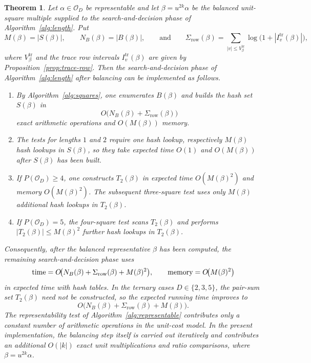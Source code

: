 \documentclass[manuscript,screen]{acmart}
\renewcommand{\le}{\leqslant}
\renewcommand{\ge}{\geqslant}
\theoremstyle{plain}
\newtheorem{theorem}{Theorem}[section]
\theoremstyle{definition}
\theoremstyle{nonitalicremark}
\newcommand{\OD}{\mathcal{O}_D}
\begin{document}
\begin{theorem}\label{thm:complexityM}
Let $\alpha\in\OD$ be representable and let $\beta=u^{2k}\alpha$ be the balanced unit-square
multiple supplied to the search-and-decision phase of Algorithm~\ref{alg:length}. Put
\[
M(\beta)=|S(\beta)|,
\qquad
N_B(\beta)=|B(\beta)|,
\qquad\text{and}\qquad
\Sigma_{\mathrm{row}}(\beta)=\sum_{|v|\le V_\beta^{\mathrm{tr}}}\log\bigl(1+|I_v^{\mathrm{tr}}(\beta)|\bigr),
\]
where $V_\beta^{\mathrm{tr}}$ and the trace row intervals $I_v^{\mathrm{tr}}(\beta)$ are given by
Proposition~\ref{prop:trace-row}. Then the search-and-decision phase of Algorithm~\ref{alg:length} after balancing can be implemented as follows.
\begin{enumerate}[label=\textup{(\alph*)},itemsep=0.25em]
\item By Algorithm~\ref{alg:squares}, one enumerates $B(\beta)$ and builds the hash set
$S(\beta)$ in
\[
O\!\bigl(N_B(\beta)+\Sigma_{\mathrm{row}}(\beta)\bigr)
\]
exact arithmetic operations and $O(M(\beta))$ memory.
\item The tests for lengths $1$ and $2$ require one hash lookup, respectively
$M(\beta)$ hash lookups in $S(\beta)$, so they take expected time $O(1)$ and
$O(M(\beta))$ after $S(\beta)$ has been built.
\item If $P(\OD)\ge 4$, one constructs $T_2(\beta)$ in expected time $O(M(\beta)^2)$ and
memory $O(M(\beta)^2)$. The subsequent three-square test uses only $M(\beta)$ additional hash
lookups in $T_2(\beta)$.
\item If $P(\OD)=5$, the four-square test scans $T_2(\beta)$ and performs
$|T_2(\beta)|\le M(\beta)^2$ further hash lookups in $T_2(\beta)$.
\end{enumerate}
Consequently, after the balanced representative $\beta$ has been computed, the remaining
search-and-decision phase uses
\[
\textup{time}=O\!\bigl(N_B(\beta)+\Sigma_{\mathrm{row}}(\beta)+M(\beta)^2\bigr),
\qquad
\textup{memory}=O\!\bigl(M(\beta)^2\bigr)
\]
in expected time with hash tables. In the ternary cases $D\in\{2,3,5\}$, the pair-sum set
$T_2(\beta)$ need not be constructed, so the expected running time improves to
\[
O\!\bigl(N_B(\beta)+\Sigma_{\mathrm{row}}(\beta)+M(\beta)\bigr).
\]
The representability test of Algorithm~\ref{alg:representable} contributes only a constant number
of arithmetic operations in the unit-cost model. In the present implementation, the balancing step
itself is carried out iteratively and contributes an additional $O(|k|)$ exact unit multiplications
and ratio comparisons, where $\beta=u^{2k}\alpha$.
\end{theorem}
\end{document}
